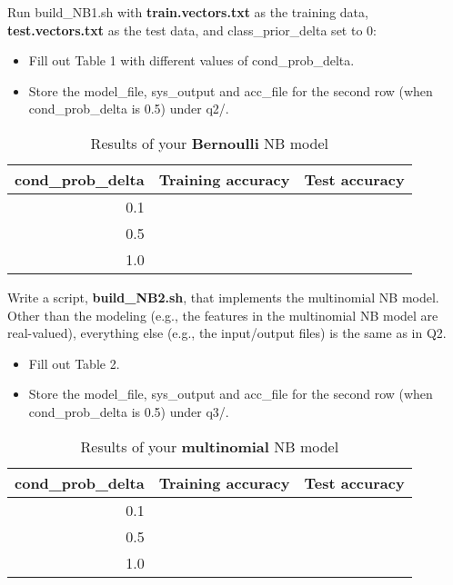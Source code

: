 \documentclass[11pt]{article}
\begin{document}
 Run build\_NB1.sh with {\bf train.vectors.txt} as the 
training data, {\bf test.vectors.txt} as the test data,
and class\_prior\_delta set to 0:
\begin{itemize}
\item Fill out Table 1 with different values of cond\_prob\_delta.
\item Store the model\_file, sys\_output
and acc\_file for the second row (when cond\_prob\_delta is 0.5) under
q2/.
\end{itemize}


\begin{table}[h]
\centering
\caption{Results of your {\bf Bernoulli} NB model}
\label{table1}
\begin{tabular}{|r|l|l|} \hline
cond\_prob\_delta   & Training accuracy & Test accuracy \\ \hline
0.1       &  &    \\ \hline
0.5       &  &    \\ \hline
1.0      &  &    \\ \hline
\end{tabular}
\end{table}


\vspace{0.4 in}

 Write a script, {\bf build\_NB2.sh}, 
  that implements the multinomial NB model. Other than the modeling
  (e.g., the features in the multinomial NB model are real-valued),
  everything else (e.g., the input/output files) is the same as in Q2.
  \begin{itemize}
  \item  Fill out Table 2.
  \item Store the model\_file, sys\_output
and acc\_file for the second row (when cond\_prob\_delta is 0.5) under
q3/.
  \end{itemize}
  

\begin{table}[h]
\centering
\caption{Results of your {\bf multinomial} NB model}
\label{table1}
\begin{tabular}{|r|l|l|} \hline
cond\_prob\_delta   & Training accuracy & Test accuracy \\ \hline
0.1       &  &    \\ \hline
0.5       &  &    \\ \hline
1.0     &  &    \\ \hline
\end{tabular}
\end{table}
\end{document}
